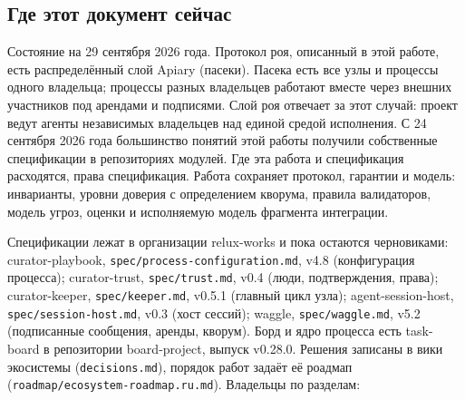 \documentclass[11pt,a4paper]{article}
\begin{document}
\subsection*{Где этот документ сейчас}

Состояние на 29 сентября 2026 года. Протокол роя, описанный в этой работе, есть распределённый слой Apiary (пасеки). Пасека есть все узлы и процессы одного владельца; процессы разных владельцев работают вместе через внешних участников под арендами и подписями. Слой роя отвечает за этот случай: проект ведут агенты независимых владельцев над единой средой исполнения. С 24 сентября 2026 года большинство понятий этой работы получили собственные спецификации в репозиториях модулей. Где эта работа и спецификация расходятся, права спецификация. Работа сохраняет протокол, гарантии и модель: инварианты, уровни доверия с определением кворума, правила валидаторов, модель угроз, оценки и исполняемую модель фрагмента интеграции.

Спецификации лежат в организации relux-works и пока остаются черновиками: curator-playbook, \texttt{spec/process-configuration.md}, v4.8 (конфигурация процесса); curator-trust, \texttt{spec/trust.md}, v0.4 (люди, подтверждения, права); curator-keeper, \texttt{spec/keeper.md}, v0.5.1 (главный цикл узла); agent-session-host, \texttt{spec/session-host.md}, v0.3 (хост сессий); waggle, \texttt{spec/waggle.md}, v5.2 (подписанные сообщения, аренды, кворум). Борд и ядро процесса есть task-board в репозитории board-project, выпуск v0.28.0. Решения записаны в вики экосистемы (\texttt{decisions.md}), порядок работ задаёт её роадмап (\texttt{roadmap/ecosystem-roadmap.ru.md}). Владельцы по разделам:
\end{document}
